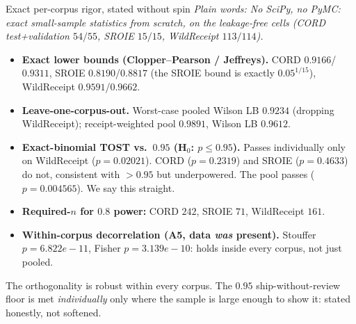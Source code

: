 \documentclass[aspectratio=169]{beamer}
\newcommand{\rgCordCPlo}{0.9166}
\newcommand{\rgCordJeff}{0.9311}
\newcommand{\rgSroieCPlo}{0.8190}
\newcommand{\rgSroieJeff}{0.8817}
\newcommand{\rgWrCPlo}{0.9591}
\newcommand{\rgWrJeff}{0.9662}
\newcommand{\rgPoolPhat}{0.9891}
\newcommand{\rgPoolWil}{0.9612}
\newcommand{\rgLocoMinWil}{0.9234}
\newcommand{\rgTostCordP}{0.2319}
\newcommand{\rgTostSroieP}{0.4633}
\newcommand{\rgTostWrP}{0.02021}
\newcommand{\rgTostPoolP}{0.004565}
\newcommand{\rgReqnCord}{242}
\newcommand{\rgReqnSroie}{71}
\newcommand{\rgReqnWr}{161}
\newcommand{\rgAFiveStouffer}{6.822e-11}
\newcommand{\rgAFiveFisher}{3.139e-10}
\newcommand{\keybox}[1]{\begin{center}\colorbox{grey!15}{\parbox{0.92\linewidth}{\centering #1}}\end{center}}
\newcommand{\plain}[1]{\textit{\textcolor{sig}{Plain words:} #1}}
\begin{document}
\begin{frame}{Exact per-corpus rigor, stated without spin}
\plain{No SciPy, no PyMC: exact small-sample statistics from
scratch, on the leakage-free cells (CORD test+validation $54/55$,
SROIE $15/15$, WildReceipt $113/114$).}
\vspace{0.4em}
\begin{itemize}
\item \textbf{Exact lower bounds (Clopper--Pearson / Jeffreys).}
CORD $\rgCordCPlo$/$\rgCordJeff$, SROIE $\rgSroieCPlo$/$\rgSroieJeff$
(the SROIE bound is exactly $0.05^{1/15}$), WildReceipt
$\rgWrCPlo$/$\rgWrJeff$.
\item \textbf{Leave-one-corpus-out.} Worst-case pooled Wilson LB
$\rgLocoMinWil$ (dropping WildReceipt); receipt-weighted pool
$\rgPoolPhat$, Wilson LB $\rgPoolWil$.
\item \textbf{Exact-binomial TOST vs.\ $0.95$ (H$_0$: $p\le0.95$).}
\textcolor{ok}{Passes individually only on WildReceipt}
($p=\rgTostWrP$). \textcolor{bad}{CORD ($p=\rgTostCordP$) and SROIE
($p=\rgTostSroieP$) do not}, consistent with $>0.95$ but
underpowered. The pool passes ($p=\rgTostPoolP$). We say this
straight.
\item \textbf{Required-$n$ for $0.8$ power:} CORD $\rgReqnCord$,
SROIE $\rgReqnSroie$, WildReceipt $\rgReqnWr$.
\item \textbf{Within-corpus decorrelation (A5, data \emph{was}
present).} Stouffer $p=\rgAFiveStouffer$, Fisher $p=\rgAFiveFisher$:
holds inside every corpus, not just pooled.
\end{itemize}
\keybox{The orthogonality is robust within every corpus. The
$0.95$ ship-without-review floor is met \emph{individually} only
where the sample is large enough to show it: stated honestly, not
softened.}
\end{frame}
\end{document}
